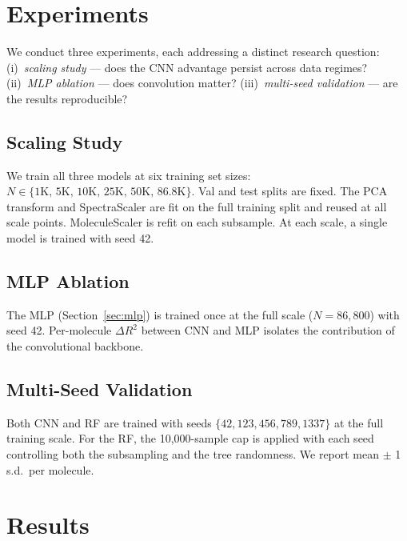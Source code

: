 \documentclass[11pt]{article}
\begin{document}
\section{Experiments}
\label{sec:experiments}

We conduct three experiments, each addressing a distinct research question:
(i)~\textit{scaling study} — does the CNN advantage persist across data regimes?
(ii)~\textit{MLP ablation} — does convolution matter?
(iii)~\textit{multi-seed validation} — are the results reproducible?

\subsection{Scaling Study}
\label{sec:exp_scaling}

We train all three models at six training set sizes:
$N \in \{1\text{K},\, 5\text{K},\, 10\text{K},\, 25\text{K},\, 50\text{K},\, 86.8\text{K}\}$.
Val and test splits are fixed. The PCA transform and SpectraScaler are fit
on the full training split and reused at all scale points. MoleculeScaler
is refit on each subsample. At each scale, a single model is trained with seed 42.

\subsection{MLP Ablation}
\label{sec:exp_ablation}

The MLP (Section~\ref{sec:mlp}) is trained once at the full scale
($N = 86{,}800$) with seed 42. Per-molecule $\Delta R^2$ between CNN and MLP
isolates the contribution of the convolutional backbone.

\subsection{Multi-Seed Validation}
\label{sec:exp_multiseed}

Both CNN and RF are trained with seeds $\{42, 123, 456, 789, 1337\}$ at
the full training scale. For the RF, the 10{,}000-sample cap is applied with
each seed controlling both the subsampling and the tree randomness. We report
mean $\pm$ 1 s.d.\ per molecule.


\section{Results}
\label{sec:results}
\end{document}
